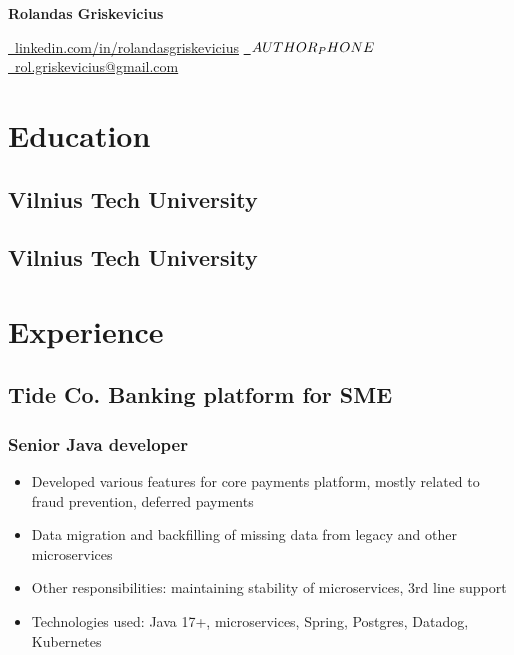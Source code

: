 \documentclass[11pt]{article}
\begin{document}


\begin{center}
  {\Huge\bfseries Rolandas Griskevicius} \\ \medskip

  \href{linkedin.com/in/rolandasgriskevicius}{\faLinkedin~linkedin.com/in/rolandasgriskevicius} \quad
  \href{tel:$\authorphone$}{\faPhone~$AUTHOR_PHONE$} \quad
  \href{mailto:rol.griskevicius@gmail.com}{\faEnvelope~rol.griskevicius@gmail.com} \quad
\end{center}

\section{Education}
\subsection{Vilnius Tech University  }
\subsection{Vilnius Tech University  }


\section{Experience}

\subsection{Tide Co. Banking platform for SME}
\subsubsection{Senior Java developer }
\begin{itemize}
\item Developed various features for core payments platform, mostly related to fraud prevention, deferred payments
\item Data migration and backfilling of missing data from legacy and other microservices
\item Other responsibilities: maintaining stability of microservices, 3rd line support
\item Technologies used: Java 17+, microservices, Spring, Postgres, Datadog, Kubernetes
\end{itemize}
\end{document}

